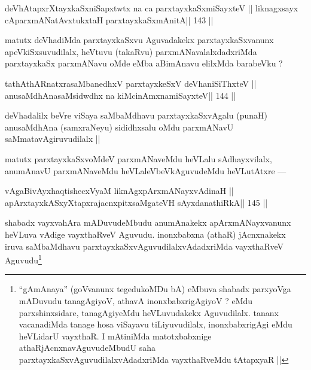 \begin{shl}
\footnotemark[3]deVhAtapxrXtayxkaSxniSapxtwtx na ca parxtayxkaSxmiSayxteV ||
liknagxsayx cAparxmANatAvxtukxtaH  parxtayxkaSxmAnitA\hfill || 143 ||
\end{shl}

\begin{artha}
matutx deVhadiMda parxtayxkaSxvu Aguvadakekx parxtayxkaSxvanunx apeVkiSxsuvudilalx, heVtuvu (takaRvu) parxmANavalalxdadxriMda parxtayxkaSx parxmANavu oMde eMba aBimAnavu elilxMda barabeVku ?
\end{artha}

\begin{shl}
\footnotemark[4]tathA\s thARnatxrasaMbanedhxV parxtayxkeSxV deVhaniSiThxteV ||
anusaMdhAnasaMsidwdhx na kiMcinAmxnamiSayxteV\hfill || 144 ||
\end{shl}

\begin{artha}
deVhadalilx beVre viSaya saMbaMdhavu parxtayxkaSxvAgalu (punaH) 
anusaMdhAna (samxraNeyu) sididhxsalu oMdu parxmANavU saMmatavAgiruvudilalx || 
\end{artha}

\begin{artha}
matutx parxtayxkaSxvoMdeV parxmANaveMdu heVLalu sAdhayxvilalx, anumAnavU parxmANaveMdu heVLaleVbeVkAguvudeMdu heVLutAtxre ---
\end{artha}

\begin{shl}
vAgaBivAyxhaqtishecxVyaM liknAgxpArxmANayxvAdinaH ||
apArxtayxkASxyXtapxrajacnxpitxsaMgateVH sAyxdanathiRkA\hfill || 145 ||
\end{shl}

\begin{artha}
shabadx vayxvahAra mADuvudeMbudu anumAnakekx apArxmANayxvanunx heVLuva 
vAdige vayxthaRveV Aguvudu. inonxbabxna (athaR) jAcnxnakekx iruva 
saMbaMdhavu parxtayxkaSxvAguvudilalxvAdadxriMda vayxthaRveV 
Aguvudu\footnote[5]{``gAmAnaya'' (goVvanunx tegedukoMDu bA) eMbuva 
shabadx parxyoVga mADuvudu tanagAgiyoV, athavA inonxbabxrigAgiyoV ? eMdu parxshinxsidare, tanagAgiyeMdu heVLuvudakekx Aguvudilalx. tananx vacanadiMda tanage hosa viSayavu tiLiyuvudilalx, inonxbabxrigAgi eMdu heVLidarU vayxthaR. I mAtiniMda matotxbabxnige athaRjAcnxnavAguvudeMbudU saha parxtayxkaSxvAguvudilalxvAdadxriMda vayxthaRveMdu tAtapxyaR ||}
\end{artha}

